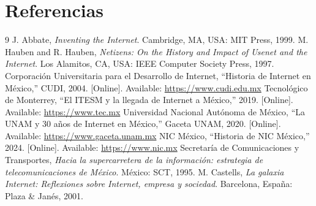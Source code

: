 \documentclass[11pt,a4paper]{article}
\begin{document}
\section*{Referencias}

\begin{thebibliography}{9}
   J. Abbate, \textit{Inventing the Internet}. Cambridge, MA, USA: MIT Press, 1999.
   M. Hauben and R. Hauben, \textit{Netizens: On the History and Impact of Usenet and the Internet}. Los Alamitos, CA, USA: IEEE Computer Society Press, 1997.
   Corporación Universitaria para el Desarrollo de Internet, ``Historia de Internet en México,'' CUDI, 2004. [Online]. Available: \url{https://www.cudi.edu.mx}
   Tecnológico de Monterrey, ``El ITESM y la llegada de Internet a México,'' 2019. [Online]. Available: \url{https://www.tec.mx}
   Universidad Nacional Autónoma de México, ``La UNAM y 30 años de Internet en México,'' Gaceta UNAM, 2020. [Online]. Available: \url{https://www.gaceta.unam.mx}
   NIC México, ``Historia de NIC México,'' 2024. [Online]. Available: \url{https://www.nic.mx}
   Secretaría de Comunicaciones y Transportes, \textit{Hacia la supercarretera de la información: estrategia de telecomunicaciones de México}. México: SCT, 1995.
   M. Castells, \textit{La galaxia Internet: Reflexiones sobre Internet, empresa y sociedad}. Barcelona, España: Plaza \& Janés, 2001.
\end{thebibliography}
\end{document}
